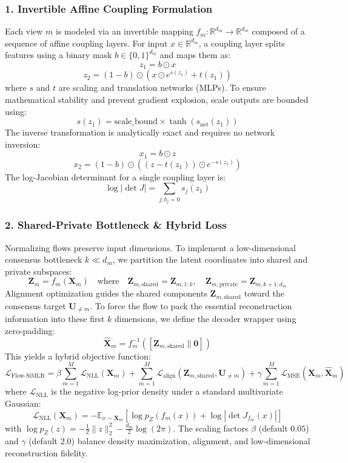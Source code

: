 \documentclass[
  letterpaper,
]{report}
\begin{document}
\subsubsection{1. Invertible Affine Coupling
Formulation}\label{invertible-affine-coupling-formulation}

Each view \(m\) is modeled via an invertible mapping
\(f_m: \mathbb{R}^{d_m} \to \mathbb{R}^{d_m}\) composed of a sequence of
affine coupling layers. For input \(x \in \mathbb{R}^{d_m}\), a coupling
layer splits features using a binary mask \(b \in \{0, 1\}^{d_m}\) and
maps them as: \[z_{1} = b \odot x\]
\[z_{2} = (1 - b) \odot \left( x \odot e^{s(z_{1})} + t(z_{1}) \right)\]
where \(s\) and \(t\) are scaling and translation networks (MLPs). To
ensure mathematical stability and prevent gradient explosion, scale
outputs are bounded using:
\[s(z_{1}) = \text{scale\_bound} \times \tanh\left(s_{\text{net}}(z_{1})\right)\]
The inverse transformation is analytically exact and requires no network
inversion: \[x_{1} = b \odot z\]
\[x_{2} = (1 - b) \odot \left( (z - t(z_{1})) \odot e^{-s(z_{1})} \right)\]
The log-Jacobian determinant for a single coupling layer is:
\[\log |\det J| = \sum_{j: b_j = 0} s_j(z_{1})\]

\subsubsection{2. Shared-Private Bottleneck \& Hybrid
Loss}\label{shared-private-bottleneck-hybrid-loss}

Normalizing flows preserve input dimensions. To implement a
low-dimensional consensus bottleneck \(k \ll d_m\), we partition the
latent coordinates into shared and private subspaces:
\[\mathbf{Z}_m = f_m(\mathbf{X}_m) \quad \text{where} \quad \mathbf{Z}_{m,\text{shared}} = \mathbf{Z}_{m, 1:k}, \quad \mathbf{Z}_{m,\text{private}} = \mathbf{Z}_{m, k+1:d_m}\]
Alignment optimization guides the shared components
\(\mathbf{Z}_{m,\text{shared}}\) toward the consensus target
\(\mathbf{U}_{\neq m}\). To force the flow to pack the essential
reconstruction information into these first \(k\) dimensions, we define
the decoder wrapper using zero-padding:
\[\hat{\mathbf{X}}_m = f_m^{-1}\left([\mathbf{Z}_{m,\text{shared}} \parallel \mathbf{0}]\right)\]
This yields a hybrid objective function:
\[\mathcal{L}_{\text{Flow-SiMLR}} = \beta \sum_{m=1}^M \mathcal{L}_{\text{NLL}}(\mathbf{X}_m) + \sum_{m=1}^M \mathcal{L}_{\text{align}}(\mathbf{Z}_{m,\text{shared}}, \mathbf{U}_{\neq m}) + \gamma \sum_{m=1}^M \mathcal{L}_{\text{MSE}}(\mathbf{X}_m, \hat{\mathbf{X}}_m)\]
where \(\mathcal{L}_{\text{NLL}}\) is the negative log-prior density
under a standard multivariate Gaussian:
\[\mathcal{L}_{\text{NLL}}(\mathbf{X}_m) = - \mathbb{E}_{x \sim \mathbf{X}_m} \left[ \log p_Z(f_m(x)) + \log |\det J_{f_m}(x)| \right]\]
with \(\log p_Z(z) = -\frac{1}{2} \|z\|_2^2 - \frac{d_m}{2}\log(2\pi)\).
The scaling factors \(\beta\) (default \(0.05\)) and \(\gamma\) (default
\(2.0\)) balance density maximization, alignment, and low-dimensional
reconstruction fidelity.
\end{document}

